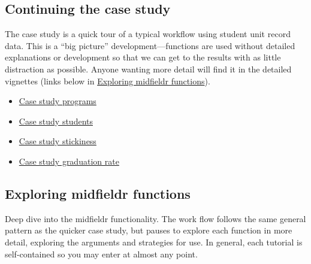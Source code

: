 \documentclass[
]{book}
\providecommand{\tightlist}{%
  \setlength{\itemsep}{0pt}\setlength{\parskip}{0pt}}
\begin{document}
\hypertarget{continuing-the-case-study}{%
\subsection{Continuing the case study}\label{continuing-the-case-study}}

The case study is a quick tour of a typical workflow using student unit record data. This is a ``big picture'' development---functions are used without detailed explanations or development so that we can get to the results with as little distraction as possible. Anyone wanting more detail will find it in the detailed vignettes (links below in \protect\hyperlink{exploring-midfieldr-functions}{Exploring midfieldr functions}).

\begin{itemize}
\tightlist
\item
  \href{https://midfieldr.github.io/midfieldr/articles/art-110-case-study-programs.html}{Case study programs}
\item
  \href{https://midfieldr.github.io/midfieldr/articles/art-120-case-study-students.html}{Case study students}
\item
  \href{https://midfieldr.github.io/midfieldr/articles/art-130-case-study-stickiness.html}{Case study stickiness}
\item
  \href{https://midfieldr.github.io/midfieldr/articles/art-140-case-study-grad-rate.html}{Case study graduation rate}
\end{itemize}

\hypertarget{exploring-midfieldr-functions}{%
\subsection{Exploring midfieldr functions}\label{exploring-midfieldr-functions}}

Deep dive into the midfieldr functionality. The work flow follows the same general pattern as the quicker case study, but pauses to explore each function in more detail, exploring the arguments and strategies for use. In general, each tutorial is self-contained so you may enter at almost any point.
\end{document}
